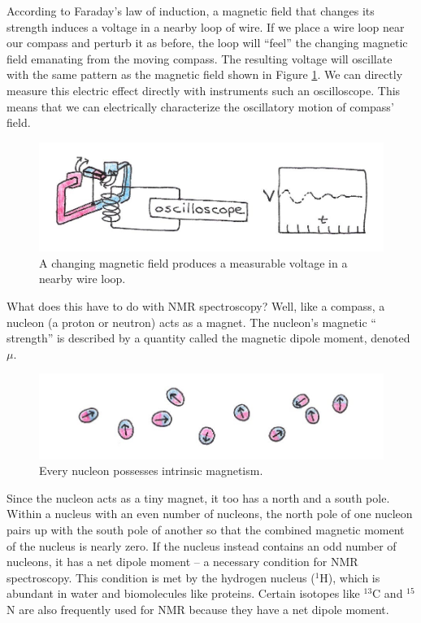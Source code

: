 According to Faraday's law of induction, a magnetic field that changes its strength induces a voltage in a nearby loop of wire.  If we place a wire loop near our compass and perturb it as before, the loop will ``feel'' the changing magnetic field emanating from the moving compass.  The resulting voltage will oscillate with the same pattern as the magnetic field shown in Figure \ref{Fig9-12}. We can directly measure this electric effect directly with instruments such an oscilloscope.  This means that we can electrically characterize the oscillatory motion of compass' field.  
\begin{figure}[h]
	\centering
	\includegraphics[width=5.0in]{./figures/Topic9/Fig9-12.jpg}
	\caption{A changing magnetic field produces a measurable voltage in a nearby wire loop.}
 	\label{Fig9-12}
\end{figure} 
What does this have to do with NMR spectroscopy?  Well, like a compass, a nucleon (a proton or neutron) acts as a magnet.  The nucleon's magnetic `` strength'' is described by a quantity called the magnetic dipole moment, denoted $\mu$.
\begin{figure}[h]
	\centering
	\includegraphics[width=5.0in]{./figures/Topic9/Fig9-13.jpg}
	\caption{Every nucleon possesses intrinsic magnetism.}
 	\label{Fig9-13}
\end{figure} 
Since the nucleon acts as a tiny magnet, it too has a north and a south pole.  Within a nucleus with an even number of nucleons, the north pole of one nucleon pairs up with the south pole of another so that the combined magnetic moment of the nucleus is nearly zero.  If the nucleus instead contains an odd number of nucleons, it has a net dipole moment -- a necessary condition for NMR spectroscopy.  This condition is met by the hydrogen nucleus ($^1$H), which is abundant in water and biomolecules like proteins.  Certain isotopes like $^{13}$C and $^{15}$N are also frequently used for NMR because they have a net dipole moment.

